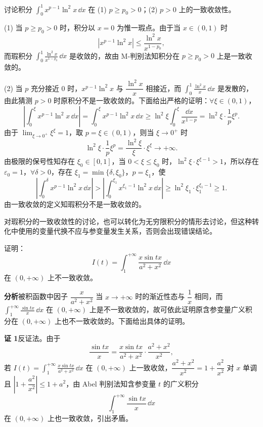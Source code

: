 \begin{xexample}[23.2.3]
讨论积分 $\displaystyle\int_0^1x^{p-1}\ln^2x\,\dd x$ 在 (1) $p\geqslant p_0>0$；(2) $p>0$ 上的一致收敛性。
\end{xexample}
\begin{xsolution}
(1) 当 $p\geqslant p_0>0$ 时，积分以 $x=0$ 为惟一瑕点。由于当 $x\in(0,1)$ 时
\[
  |x^{p-1}\ln^2x|\leqslant\frac{\ln^2x}{x^{1-p_0}},
\]
而瑕积分 $\displaystyle\int_0^1\frac{\ln^2x}{x^{1-p_0}}\,\dd x$ 是收敛的，故由 M-判别法知积分在 $p\geqslant p_0>0$ 上是一致收敛的。

(2) 当 $p$ 充分接近 0 时，$x^{p-1}\ln^2x$ 与 $\dfrac{\ln^2x}{x}$ 相接近，而 $\displaystyle\int_0^1\frac{\ln^2x}{x}\,\dd x$ 是发散的，由此猜测 $p>0$ 时原积分不是一致收敛的。下面给出严格的证明：$\forall\xi\in(0,1)$，
\[
  \left|\int_0^\xi x^{p-1}\ln^2x\,\dd x\right|=\int_0^\xi x^{p-1}\ln^2x\,\dd x
  \geqslant\ln^2\xi\int_0^\xi\frac{\dd x}{x^{1-p}}
  =\ln^2\xi\cdot\frac1p\xi^p.
\]
由于 $\displaystyle\lim_{\xi\to0^+}\xi^\xi=1$，取 $p=\xi\in(0,1)$，则当 $\xi\to0^+$ 时
\[
  \ln^2\xi\cdot\frac1p\xi^p=\frac{\ln^2\xi}{\xi}\cdot\xi^\xi\to+\infty.
\]
由极限的保号性知存在 $\xi_0\in[0,1]$，当 $0<\xi\leqslant\xi_0$ 时，$\ln^2\xi\cdot\xi^{\xi-1}>1$，所以存在 $\varepsilon_0=1$，$\forall\delta>0$，存在 $\xi_1=\min\{\delta,\xi_0\}$，$p=\xi_1$，使
\[
  \left|\int_0^\delta x^{p-1}\ln^2x\,\dd x\right|
  >\left|\int_0^{\xi_1}x^{\xi_1-1}\ln^2x\,\dd x\right|
  \geqslant\ln^2\xi_1\cdot\xi_1^{\xi_1-1}\geqslant1.
\]
由一致收敛的定义知瑕积分不是一致收敛的。
\end{xsolution}

\begin{xremark}
对瑕积分的一致收敛性的讨论，也可以转化为无穷限积分的情形去讨论，但这种转化中使用的变量代换不应与参变量发生关系，否则会出现错误结论。
\end{xremark}

\begin{xexample}[23.2.4]
证明：
\[
  I(t)=\int_1^{+\infty}\frac{x\sin tx}{a^2+x^2}\,\dd x
\]
在 $(0,+\infty)$ 上不一致收敛。
\end{xexample}

\textbf{分析}\quad 被积函数中因子 $\dfrac{x}{a^2+x^2}$ 当 $x\to+\infty$ 时的渐近性态与 $\dfrac1x$ 相同，而 $\displaystyle\int_1^{+\infty}\frac{\sin tx}{x}\,\dd x$ 在 $(0,+\infty)$ 上是不一致收敛的，故可依此证明原含参变量广义积分在 $(0,+\infty)$ 上也不一致收敛的。下面给出具体的证明。

\textbf{证 1}\quad 反证法。由于
\[
  \frac{\sin tx}{x}=\frac{x\sin tx}{a^2+x^2}\cdot\frac{a^2+x^2}{x^2},
\]
若 $I(t)=\displaystyle\int_1^{+\infty}\frac{x\sin tx}{a^2+x^2}\,\dd x$ 在 $(0,+\infty)$ 上一致收敛，$\dfrac{a^2+x^2}{x^2}=1+\dfrac{a^2}{x^2}$ 对 $x$ 单调且 $\left|1+\dfrac{a^2}{x^2}\right|\leqslant1+a^2$，由 Abel 判别法知含参变量 $t$ 的广义积分
\[
  \int_1^{+\infty}\frac{\sin tx}{x}\,\dd x
\]
在 $(0,+\infty)$ 上也一致收敛，引出矛盾。


